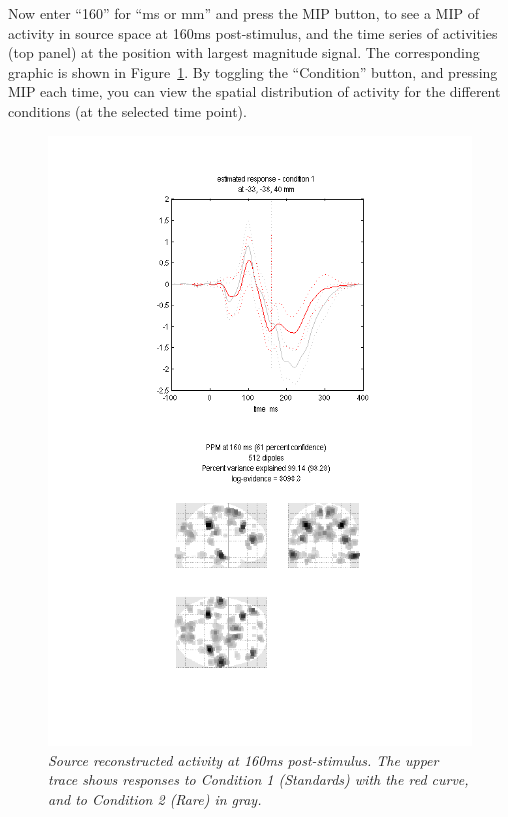Now enter ``160'' for ``ms or mm'' and press the MIP button, to see a MIP of activity in source space at 160ms post-stimulus, and the time series of activities (top panel) at the position with largest magnitude signal. The corresponding graphic is shown in Figure~\ref{invert}. By toggling the ``Condition'' button, and pressing MIP each time, you can view the spatial distribution of activity for the different conditions (at the selected time point).
\begin{figure}
\begin{center}
\includegraphics[width=120mm]{mmn/invert}
\caption{\em Source reconstructed activity at 160ms post-stimulus.
The upper trace shows responses to Condition 1 (Standards) with the red curve, and to Condition 2 (Rare) in gray.
\label{invert}}
\end{center}
\end{figure}

